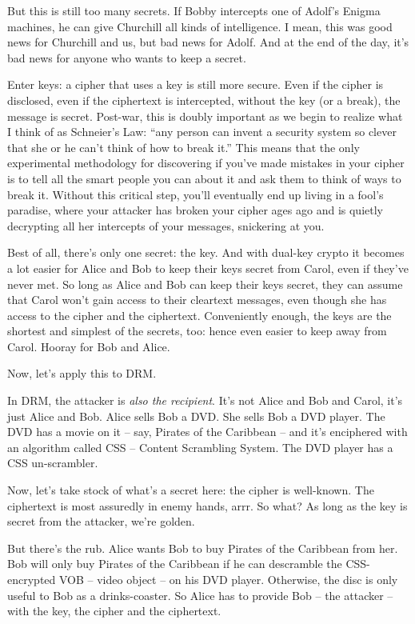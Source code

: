 But this is still too many secrets. If Bobby intercepts one of
Adolf's Enigma machines, he can give Churchill all kinds of
intelligence. I mean, this was good news for Churchill and us, but
bad news for Adolf. And at the end of the day, it's bad news for
anyone who wants to keep a secret.

Enter keys: a cipher that uses a key is still more secure. Even if
the cipher is disclosed, even if the ciphertext is intercepted,
without the key (or a break), the message is secret. Post-war, this
is doubly important as we begin to realize what I think of as
Schneier's Law: ``any person can invent a security system so clever
that she or he can't think of how to break it.'' This means that the
only experimental methodology for discovering if you've made
mistakes in your cipher is to tell all the smart people you can
about it and ask them to think of ways to break it. Without this
critical step, you'll eventually end up living in a fool's
paradise, where your attacker has broken your cipher ages ago and
is quietly decrypting all her intercepts of your messages,
snickering at you.

Best of all, there's only one secret: the key. And with dual-key
crypto it becomes a lot easier for Alice and Bob to keep their keys
secret from Carol, even if they've never met. So long as Alice and
Bob can keep their keys secret, they can assume that Carol won't
gain access to their cleartext messages, even though she has access
to the cipher and the ciphertext. Conveniently enough, the keys are
the shortest and simplest of the secrets, too: hence even easier to
keep away from Carol. Hooray for Bob and Alice.

Now, let's apply this to DRM.

In DRM, the attacker is \emph{also the recipient}. It's not Alice
and Bob and Carol, it's just Alice and Bob. Alice sells Bob a DVD.
She sells Bob a DVD player. The DVD has a movie on it -- say,
Pirates of the Caribbean -- and it's enciphered with an algorithm
called CSS -- Content Scrambling System. The DVD player has a CSS
un-scrambler.

Now, let's take stock of what's a secret here: the cipher is
well-known. The ciphertext is most assuredly in enemy hands, arrr.
So what? As long as the key is secret from the attacker, we're
golden.

But there's the rub. Alice wants Bob to buy Pirates of the
Caribbean from her. Bob will only buy Pirates of the Caribbean if
he can descramble the CSS-encrypted VOB -- video object -- on his
DVD player. Otherwise, the disc is only useful to Bob as a
drinks-coaster. So Alice has to provide Bob -- the attacker -- with
the key, the cipher and the ciphertext.

